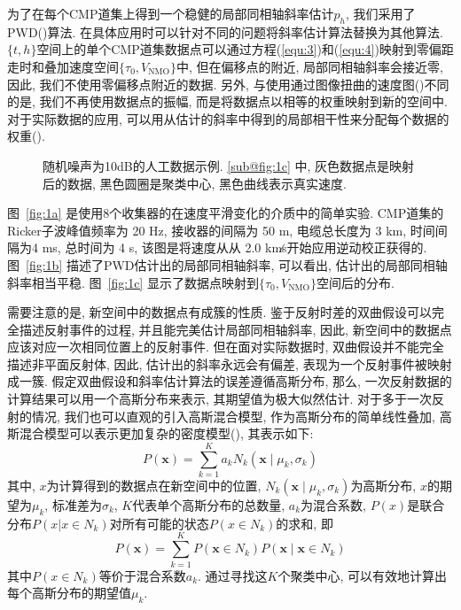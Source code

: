 为了在每个CMP道集上得到一个稳健的局部同相轴斜率估计$p_h$, 我们采用了PWD(\cite{Fomel2002, Chen2013})算法. 在具体应用时可以针对不同的问题将斜率估计算法替换为其他算法. $\{t,h\}$空间上的单个CMP道集数据点可以通过方程(\ref{equ:3})和(\ref{equ:4})映射到零偏距走时和叠加速度空间$\{\tau_0,V_{\mathrm{NMO}}\}$中, 但在偏移点的附近, 局部同相轴斜率会接近零, 因此, 我们不使用零偏移点附近的数据. 另外, 与使用通过图像扭曲的速度图(\cite{Fomel2007})不同的是, 我们不再使用数据点的振幅, 而是将数据点以相等的权重映射到新的空间中. 对于实际数据的应用, 可以用从估计的斜率中得到的局部相干性来分配每个数据的权重(\cite{Zhang2013}). 
\begin{figure}[htb]
    \centering
    \caption{随机噪声为10dB的人工数据示例. \ref{sub@fig:1c} 中, 灰色数据点是映射后的数据, 黑色圆圈是聚类中心, 黑色曲线表示真实速度. 
    }
\end{figure}
图~\ref{fig:1a} 是使用8个收集器的在速度平滑变化的介质中的简单实验. CMP道集的Ricker子波峰值频率为 20 Hz, 接收器的间隔为 50 m, 电缆总长度为 3 km, 时间间隔为4 ms, 总时间为 4 s, 该图是将速度从从 2.0 km∕s开始应用逆动校正获得的. 图~\ref{fig:1b} 描述了PWD估计出的局部同相轴斜率, 可以看出, 估计出的局部同相轴斜率相当平稳. 图~\ref{fig:1c} 显示了数据点映射到$\{\tau_0,V_{\mathrm{NMO}}\}$空间后的分布. 

需要注意的是, 新空间中的数据点有成簇的性质. 鉴于反射时差的双曲假设可以完全描述反射事件的过程, 并且能完美估计局部同相轴斜率, 因此, 新空间中的数据点应该对应一次相同位置上的反射事件. 但在面对实际数据时, 双曲假设并不能完全描述非平面反射体, 因此, 估计出的斜率永远会有偏差, 表现为一个反射事件被映射成一簇. 假定双曲假设和斜率估计算法的误差遵循高斯分布, 那么, 一次反射数据的计算结果可以用一个高斯分布来表示, 其期望值为极大似然估计. 对于多于一次反射的情况, 我们也可以直观的引入高斯混合模型, 作为高斯分布的简单线性叠加, 高斯混合模型可以表示更加复杂的密度模型(\cite{Bishop2006}), 其表示如下: 
\begin{equation}
    P(\mathbf{x})=\sum_{k=1}^{K} a_{k} N_{k}\left(\mathbf{x} \mid \mu_{k}, \sigma_{k}\right)
\end{equation}
其中, $x$为计算得到的数据点在新空间中的位置, $N_{k}\left(\mathbf{x} \mid \mu_{k}, \sigma_{k}\right)$为高斯分布, $x$的期望为$\mu_k$, 标准差为$\sigma_k$, $K$代表单个高斯分布的总数量, $a_k$为混合系数, $P(x)$是联合分布$P(x|x\in N_k)$对所有可能的状态$P(x\in N_k)$的求和, 即
\begin{equation}
    P(\mathbf{x})=\sum_{k=1}^{K} P\left(\mathbf{x} \in N_{k}\right) P\left(\mathbf{x} \mid \mathbf{x} \in N_{k}\right)
\end{equation}
其中$P(x\in N_k)$等价于混合系数$a_k$. 通过寻找这$K$个聚类中心, 可以有效地计算出每个高斯分布的期望值$\mu_k$. 

